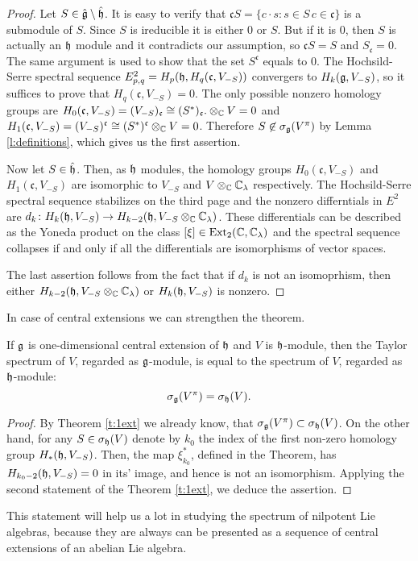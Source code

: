 \begin{proof}
    Let $S \in \hat{\mathfrak{g}} \setminus \hat{\mathfrak{h}}$. It is easy to verify that $\mathfrak{c}S=\{c\cdot s
    \colon s \in S\, c \in \mathfrak{c}\}$ is a submodule of $S$. Since $S$ is ireducible it is
    either $0$ or $S$. But if it is $0$, then $S$ is actually an $\mathfrak{h}$ module and it contradicts
    our assumption, so $\mathfrak{c}S = S$ and $S_\mathfrak{c} = 0$. The same argument is used
    to show that the set $S^\mathfrak{c}$ equals to $0$. The Hochsild-Serre spectral sequence
    $E^2_{p, q} = H_p(\mathfrak{h}, H_q(\mathfrak{c}, V_{-S}))$ convergers to $H_k(\mathfrak{g}, V_{-S})$, so it
    suffices to prove that $H_q(\mathfrak{c}, V_{- S})= 0$. The only possible nonzero homology
    groups are $H_0(\mathfrak{c}, V_{-S}) = (V_{-S})_\mathfrak{c} \cong (S^*)_\mathfrak{c}.
    \otimes_{\mathbb{C}} V = 0$ and $H_1(\mathfrak{c}, V_{-S}) = (V_{-S})^\mathfrak{c} \cong
    (S^*)^\mathfrak{c} \otimes_{\mathbb{C}} V = 0$. Therefore $S \not\in \sigma_{\mathfrak{g}}(V^\pi)$ by Lemma
    \ref{l:definitions}, which gives us the first assertion.

    Now let $S \in \hat{\mathfrak{h}}$. Then, as $\mathfrak{h}$ modules, the homology groups $H_0(\mathfrak{c},
    V_{-S})$ and $H_1(\mathfrak{c}, V_{-S})$ are isomorphic to $V_{-S}$ and $V\otimes_{\mathbb{C}}
    \mathbb{C}_\lambda$ respectively. The Hochsild-Serre spectral sequence stabilizes on the third page
    and the nonzero differntials in $E^2$ are $d_k\colon H_k(\mathfrak{h}, V_{-S}) \to H_{k - 2}(\mathfrak{h},
    V_{-S}\otimes_{\mathbb{C}} \mathbb{C}_\lambda)$. These differentials can be described as the Yoneda product on
    the class $[\xi] \in \operatorname{Ext}_2(\mathbb{C}, \mathbb{C}_\lambda)$ and the spectral sequence collapses if and only
    if all the differentials are isomorphisms of vector spaces.

    The last assertion follows from the fact that if $d_k$ is not an isomoprhism, then either
    $H_{k - 2}(\mathfrak{h},  V_{-S}\otimes_{\mathbb{C}} \mathbb{C}_\lambda)$ or $H_k(\mathfrak{h}, V_{-S})$ is nonzero.
\end{proof}
In case of central extensions we can strengthen the theorem.
\begin{corollary}
    If $\mathfrak{g}$ is one-dimensional central extension of $\mathfrak{h}$ and $V$ is $\mathfrak{h}$-module, then
    the Taylor spectrum of $V$, regarded as $\mathfrak{g}$-module, is equal to the spectrum of $V$,
    regarded as $\mathfrak{h}$-module:
    \[
        \sigma_{\mathfrak{g}}(V^\pi) = \sigma_{\mathfrak{h}}(V).
    \]

\end{corollary}
\begin{proof}
    By Theorem \ref{t:1ext} we already know, that $\sigma_{\mathfrak{g}}(V^\pi) \subset \sigma_{\mathfrak{h}}(V)$. On
    the other hand, for any $S\in \sigma_{\mathfrak{h}}(V)$ denote by $k_0$ the index of the first non-zero
    homology group $H_*(\mathfrak{h}, V_{-S})$. Then, the map $\xi^*_{k_0}$, defined in the Theorem, has
    $H_{k_0 - 2}(\mathfrak{h}, V_{-S}) = 0$ in its' image, and hence is not an isomorphism. Applying the
    second statement of the Theorem \ref{t:1ext}, we deduce the assertion.
\end{proof}
This statement will help us a lot in studying the spectrum of nilpotent Lie algebras, because they are
always can be presented as a sequence of central extensions of an abelian Lie algebra.
